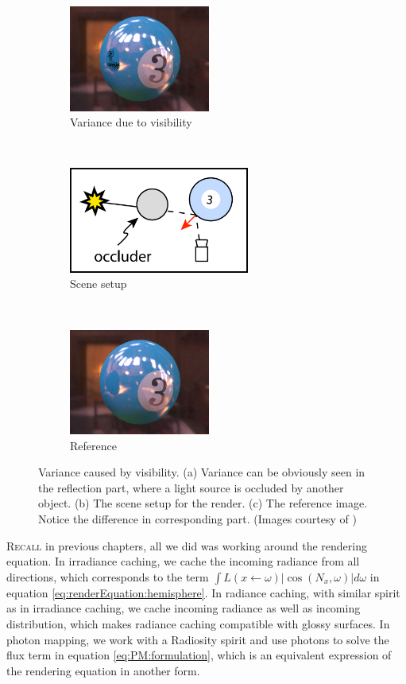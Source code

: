 \documentclass[]{book}
\begin{document}
\begin{figure}[!ht]
	\begin{subfigure}{0.30\textwidth}
		\includegraphics[height=1.37in]{img/VC-0-variance.png}
		\caption{Variance due to visibility}
	\end{subfigure}%
	~
	\begin{subfigure}{0.38\textwidth}
		\includegraphics[height=1.37in]{img/VC-0-scene.png}
		\caption{Scene setup}
	\end{subfigure}%
	~
	\begin{subfigure}{0.30\textwidth}
		\includegraphics[height=1.37in]{img/VC-0-reference.png}
		\caption{Reference}
	\end{subfigure}
	\caption[Variance Due to Visibility]{Variance caused by visibility. (a) Variance can be obviously seen in the reflection part, where a light source is occluded by another object. (b) The scene setup for the render. (c) The reference image. Notice the difference in corresponding part. (Images courtesy of \citeauthor{clarberg2008VisCorrelation})}
	\label{fig:VC:intro}
\end{figure}

\lettrine{R}{ecall} in previous chapters, all we did was working around the rendering equation.
In irradiance caching, we cache the incoming radiance from all directions, which corresponds to the term $\int L(x \leftarrow \omega) \left| \cos (N_x, \omega) \right| d\omega$ in equation \ref{eq:renderEquation:hemisphere}.
In radiance caching, with similar spirit as in irradiance caching, we cache incoming radiance as well as incoming distribution, which makes radiance caching compatible with glossy surfaces.
In photon mapping, we work with a Radiosity spirit and use photons to solve the flux term in equation \ref{eq:PM:formulation}, which is an equivalent expression of the rendering equation in another form.
\end{document}
